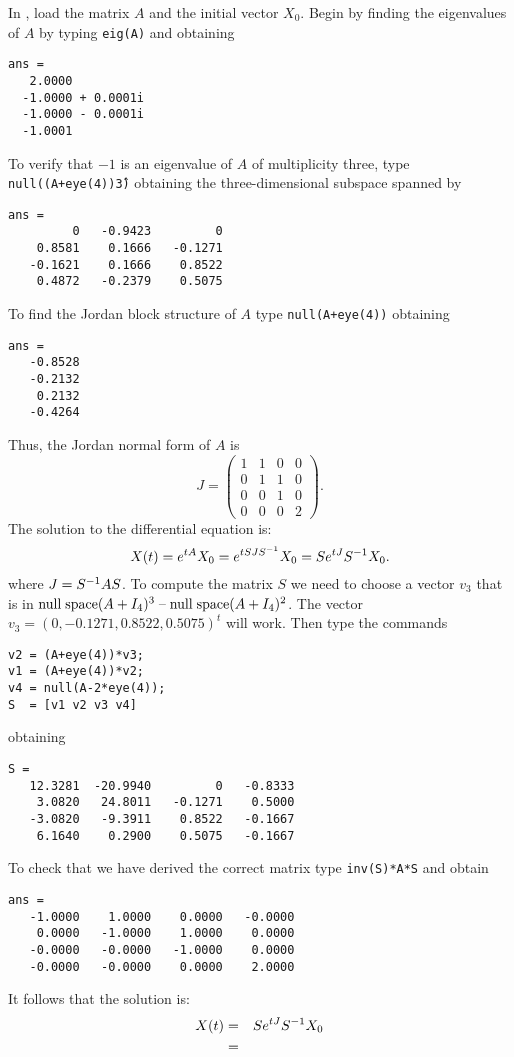 \documentclass{ximera}
\begin{document}
\begin{exercise}
\begin{solution}
\soln  In \Matlabp, load the matrix $A$ and the
initial vector $X_0$.  Begin by finding the eigenvalues of $A$ by typing 
{\tt eig(A)} and obtaining
\begin{verbatim}
ans =
   2.0000          
  -1.0000 + 0.0001i
  -1.0000 - 0.0001i
  -1.0001   
\end{verbatim}
To verify that $-1$ is an eigenvalue of $A$ of multiplicity three, type
{\tt null((A+eye(4))\^3)} obtaining the three-dimensional subspace spanned by
\begin{verbatim}
ans =
         0   -0.9423         0
    0.8581    0.1666   -0.1271
   -0.1621    0.1666    0.8522
    0.4872   -0.2379    0.5075
\end{verbatim}
To find the Jordan block structure of $A$ type {\tt null(A+eye(4))} obtaining
\begin{verbatim}
ans =
   -0.8528
   -0.2132
    0.2132
   -0.4264
\end{verbatim}
Thus, the Jordan normal form of $A$ is 
\[
J = \left(\begin{array}{rrrr} 1 & 1 & 0 & 0\\ 0 & 1 & 1 & 0\\ 0 & 0 & 1 & 0\\
0 & 0 & 0 & 2 \end{array}\right).
\]
The solution to the differential equation is:
\[
X(t) = e^{tA}X_0 = e^{tSJS^{-1}}X_0= Se^{tJ}S^{-1} X_0.
\]
where $J=S^{-1} AS$.  To compute the matrix $S$ we need to choose a vector 
$v_3$ that is in ${\rm null\;space}(A+I_4)^3\;\mbox{--}\;{\rm null\;space}(A+I_4)^2$.  The vector 
$v_3 = (0, -0.1271, 0.8522, 0.5075)^t$ will work. Then type the commands
\begin{verbatim}
v2 = (A+eye(4))*v3;
v1 = (A+eye(4))*v2;
v4 = null(A-2*eye(4));
S  = [v1 v2 v3 v4]
\end{verbatim}
obtaining
\begin{verbatim}
S =
   12.3281  -20.9940         0   -0.8333
    3.0820   24.8011   -0.1271    0.5000
   -3.0820   -9.3911    0.8522   -0.1667
    6.1640    0.2900    0.5075   -0.1667
\end{verbatim}
To check that we have derived the correct matrix type {\tt inv(S)*A*S}
and obtain
\begin{verbatim}
ans =
   -1.0000    1.0000    0.0000   -0.0000
    0.0000   -1.0000    1.0000    0.0000
   -0.0000   -0.0000   -1.0000    0.0000
   -0.0000   -0.0000    0.0000    2.0000
\end{verbatim}
It follows that the solution is:
\begin{eqnarray*}
X(t) & = & Se^{tJ}S\inv X_0 \\ & = & 

\end{eqnarray*}
\end{solution}
\end{exercise}
\end{document}
